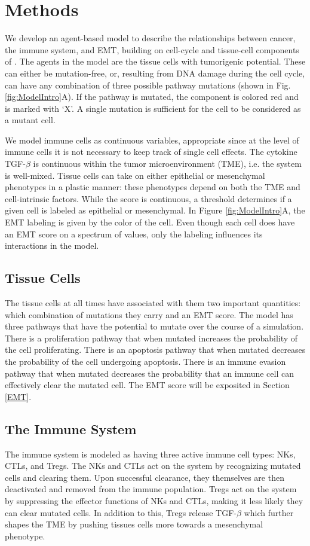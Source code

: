 \documentclass[11pt]{article}
\begin{document}
\section{Methods}
We develop an agent-based model to describe the relationships between cancer, the immune system, and EMT, building on cell-cycle and tissue-cell components of \cite{guo2017multiscale}. 
The agents in the model are the tissue cells with tumorigenic potential.
These can either be mutation-free, or, resulting from DNA damage during the cell cycle, can have any combination of three possible pathway mutations (shown in Fig. \ref{fig:ModelIntro}A).
If the pathway is mutated, the component is colored red and is marked with `X'.
A single mutation is sufficient for the cell to be considered as a mutant cell.
\par
We model immune cells as continuous variables, appropriate since at the level of immune cells it is not necessary to keep track of single cell effects.
The cytokine TGF-$\beta$ is continuous within the tumor microenvironment (TME), i.e. the system is well-mixed.
Tissue cells can take on either epithelial or mesenchymal phenotypes in a plastic manner: these phenotypes depend on both the TME and cell-intrinsic factors.
While the score is continuous, a threshold determines if a given cell is labeled as epithelial or mesenchymal.
In Figure \ref{fig:ModelIntro}A, the EMT labeling is given by the color of the cell.
Even though each cell does have an EMT score on a spectrum of values, only the labeling influences its interactions in the model.

\subsection{Tissue Cells}\label{TissueCells}
The tissue cells at all times have associated with them two important quantities: which combination of mutations they carry and an EMT score.
The model has three pathways that have the potential to mutate over the course of a simulation.
There is a proliferation pathway that when mutated increases the probability of the cell proliferating.
There is an apoptosis pathway that when mutated decreases the probability of the cell undergoing apoptosis.
There is an immune evasion pathway that when mutated decreases the probability that an immune cell can effectively clear the mutated cell.
The EMT score will be exposited in Section \ref{EMT}. 

\subsection{The Immune System}\label{ImmuneSystem}
The immune system is modeled as having three active immune cell types: NKs, CTLs, and Tregs.
The NKs and CTLs act on the system by recognizing mutated cells and clearing them.
Upon successful clearance, they themselves are then deactivated and removed from the immune population.
Tregs act on the system by suppressing the effector functions of NKs and CTLs, making it less likely they can clear mutated cells.
In addition to this, Tregs release TGF-$\beta$ which further shapes the TME by pushing tissues cells more towards a mesenchymal phenotype.
\end{document}
